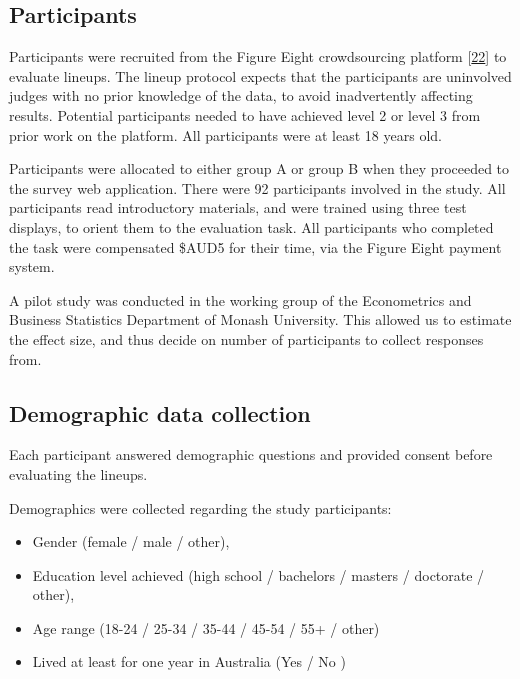 \documentclass[conference,final,]{IEEEtran}
\providecommand{\tightlist}{%
  \setlength{\itemsep}{0pt}\setlength{\parskip}{0pt}}
\begin{document}
\hypertarget{participants}{%
\subsection{Participants}\label{participants}}

Participants were recruited from the Figure Eight crowdsourcing platform {[}\protect\hyperlink{ref-figeight}{22}{]} to evaluate lineups.
The lineup protocol expects that the participants are uninvolved judges with no prior knowledge of the data, to avoid inadvertently affecting results. Potential participants needed to have achieved level 2 or level 3 from prior work on the platform. All participants were at least 18 years old.

Participants were allocated to either group A or group B when they proceeded to the survey web application. There were 92 participants involved in the study. All participants read introductory materials, and were trained using three test displays, to orient them to the evaluation task. All participants who completed the task were compensated \$AUD5 for their time, via the Figure Eight payment system.

A pilot study was conducted in the working group of the Econometrics and Business Statistics Department of Monash University. This allowed us to estimate the effect size, and thus decide on number of participants to collect responses from.

\hypertarget{demographic-data-collection}{%
\subsection{Demographic data collection}\label{demographic-data-collection}}

Each participant answered demographic questions and provided consent before evaluating the lineups.

Demographics were collected regarding the study participants:

\begin{itemize}
\tightlist
\item
  Gender (female / male / other),
\item
  Education level achieved (high school / bachelors / masters / doctorate / other),
\item
  Age range (18-24 / 25-34 / 35-44 / 45-54 / 55+ / other)
\item
  Lived at least for one year in Australia (Yes / No )
\end{itemize}
\end{document}
